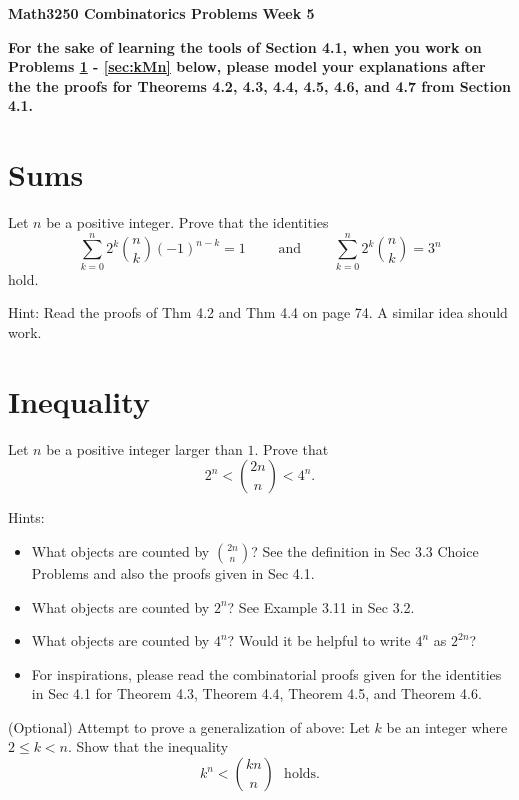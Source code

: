 \documentclass[11pt]{amsart}
\begin{document}
\begin{Large}
\textbf{Math3250 Combinatorics Problems Week 5}
\end{Large}




\noindent 
\textbf{
For the sake of learning the tools of Section 4.1, when you work on Problems \ref{sec:sums} - \ref{sec:kMn} below, please model your explanations after the the proofs for Theorems 4.2, 4.3, 4.4, 4.5, 4.6, and 4.7 from Section 4.1.}

\section{Sums}\label{sec:sums}
Let $n$ be a positive integer. Prove that the identities 
\[
\sum_{k=0}^n 2^k {n \choose k} (-1)^{n-k} = 1 \qquad \text{ and } \qquad
\sum_{k=0}^n 2^k {n \choose k} = 3^n
\]
hold. 

\noindent 
Hint: Read the proofs of Thm 4.2 and Thm 4.4 on page 74. A similar idea should work.




\section{Inequality}
Let $n$ be a positive integer larger than $1$. Prove that 
\[
2^n < {2n \choose n} < 4^n.
\]



\noindent Hints: 
\begin{itemize} \item What objects are counted by $\binom{2n}{n}$? See the definition in Sec 3.3 Choice Problems and also the proofs given in Sec 4.1. \item What objects are counted by $2^n$? See Example 3.11 in Sec 3.2. \item What objects are counted by $4^n$? Would it be helpful to write $4^n$ as $2^{2n}$? \item For inspirations, please read the combinatorial proofs given for the identities in Sec 4.1 for Theorem 4.3, Theorem 4.4, Theorem 4.5, and Theorem 4.6. \end{itemize}


\bigskip

\noindent 
(Optional) Attempt to prove a generalization of above: Let $k$ be an integer where $2 \leq k < n$. Show that the inequality 
\[
k^n < {kn \choose n} ~~~\text{holds.}
\]
\end{document}

